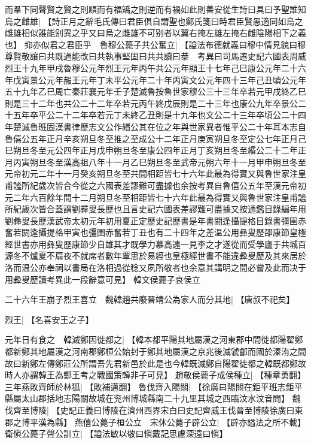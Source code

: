 而羣下同聲賢之賢之則順而有福矯之則逆而有禍如此則善安從生詩曰具曰予聖誰知烏之雌雄|{
	【詩正月之辭毛氏傳曰君臣俱自謂聖也鄭氏箋曰時君臣賢愚適同如烏之雌雄相似誰能别異之乎又曰烏之雌雄不可别者以翼右掩左雄左掩右雌陰陽相下之義也】}
抑亦似君之君臣乎　魯穆公薨子共公奮立|{
	【謚法布德就義曰穆中情見貌曰穆尊賢敬讓曰共既過能改曰共執事堅固曰共共讀曰㳟　考異曰司馬遷史記六國表周威烈王十九年甲戌魯穆公元年烈王元年丙午共公元年顯王十七年己巳康公元年二十六年戊寅景公元年赧王元年丁未平公元年二十年丙寅文公元年四十三年己丑頃公元年五十九年乙巳周亡秦莊襄元年壬子楚滅魯按魯世家穆公三十三年卒若元甲戌終乙巳則是三十二年也共公二十二年卒若元丙午終戊辰則是二十三年也康公九年卒景公二十五年卒平公二十二年卒若元丁未終乙丑則是十九年也文公二十三年卒頃公二十四年楚滅魯班固漢書律歷志文公作緡公其在位之年與世家異者惟平公二十年耳本志自魯僖公五年正月辛亥朔旦冬至推之至成公十二年正月庚寅朔旦冬至定公七年正月己巳朔旦冬至元公四年正月戊申朔旦冬至康公四年正月丁亥朔旦冬至緡公二十二年正月丙寅朔旦冬至漢高祖八年十一月乙巳朔旦冬至武帝元朔六年十一月甲申朔旦冬至元帝初元二年十一月癸亥朔旦冬至共間相距皆七十六年此最為得實又與魯世家注皇甫謐所紀歲次皆合今從之六國表差謬難可盡據也余按考異自魯僖公五年至漢元帝初元二年六百餘年間十二月朔旦冬至相距皆七十六年此最為得實又與魯世家注皇甫謐所紀歲次皆合蓋謂劉彛叟長歷也且言史記六國表差謬難可盡據又按通鑑目錄編年用劉彝叟長歷漢武帝太初元年初用夏正定歷史記歷書是年書閼逢攝提格目錄書彊圉赤奮若閼逢攝提格甲寅也彊圉赤奮若丁丑也有二十四年之差温公用彝叟歷邵康節皇極經世書亦用彝叟歷康節少自雄其才既學力慕高遠一見李之才遂從而受學廬于共城百源冬不爐夏不扇夜不就席者數年覃思於易經也皇極經世書不能違彜叟歷及其來居於洛而温公亦奉祠以書局在洛相過從稔又夙所敬者也余意其講明之間必嘗及此而决于用彜叟歷讀考異此一段辭意可見】}
韓文侯薨子哀侯立
\par
二十六年王崩子烈王喜立　魏韓趙共廢晉靖公為家人而分其地|{
	【唐叔不祀矣】}
\par
烈王|{
	【名喜安王之子】}
\par
元年日有食之　韓滅鄭因徙都之|{
	【韓本都平陽其地屬漢之河東郡中間徙都陽翟鄭都新鄭其地屬漢之河南郡鄭桓公始封于鄭其地屬漢之京兆後滅虢鄶而國於溱洧之間故曰新鄭左傳鄭莊公所謂吾先君新邑於此是也今韓既滅鄭自陽翟徙都之韓既都鄭故時人亦謂韓王為鄭王考之戰國策韓非子可見】}
趙敬侯薨子成侯種立|{
	【種章勇翻】}
三年燕敗齊師於林狐|{
	【敗補邁翻】}
魯伐齊入陽關|{
	【徐廣曰陽關在鉅平班志鉅平縣屬太山郡括地志陽關故城在兖州博城縣南二十九里其城之西臨汶水汶音問】}
魏伐齊至博陵|{
	【史記正義曰博陵在濟州西界宋白曰史記齊威王伐晉至博陵徐廣曰東郡之博平漢為縣】}
燕僖公薨子桓公立　宋休公薨子辟公立|{
	【辟亦謚法之所不載】}
衛愼公薨子聲公訓立|{
	【謚法敏以敬曰愼戴記思慮深遠曰愼】}
